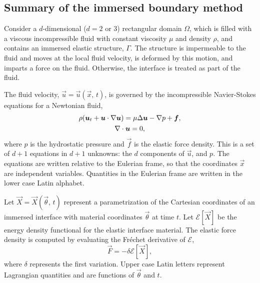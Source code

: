 \subsection{Summary of the immersed boundary method}

Consider a $d$-dimensional ($d=2$ or 3) rectangular domain $\Omega$, which is
filled with a viscous incompressible fluid with constant viscosity $\mu$ and
density $\rho$, and contains an immersed elastic structure, $\Gamma$. The
structure is impermeable to the fluid and moves at the local fluid velocity, is
deformed by this motion, and imparts a force on the fluid. Otherwise, the
interface is treated as part of the fluid. 

The fluid velocity, $\vec{u} = \vec{u}(\vec{x},\,t)$, is governed by the
incompressible Navier-Stokes equations for a Newtonian fluid,
\begin{gather}
    \label{eq:ins-momentum}
    \rho(\boldsymbol{u}_t + \boldsymbol{u}\cdot\nabla\boldsymbol{u}) = \mu\Delta\boldsymbol{u} - \nabla p + \boldsymbol{f}, \\
    \label{eq:ins-incompressibility}
    \nabla\cdot\boldsymbol{u} = 0,
\end{gather}
where $p$ is the hydrostatic pressure and $\vec{f}$ is the elastic force
density. This is a set of $d+1$ equations in $d+1$ unknowns: the $d$ components
of $\vec{u}$, and $p$. The equations are written relative to the Eulerian
frame, so that the coordinates $\vec{x}$ are independent variables. Quantities
in the Eulerian frame are written in the lower case Latin alphabet.

Let $\vec{X}=\vec{X}(\vec{\theta},\,t)$ represent a parametrization of the
Cartesian coordinates of an immersed interface with material coordinates
$\vec{\theta}$ at time $t$. Let $\mathcal{E}[\vec{X}]$ be the energy density
functional for the elastic interface material. The elastic force density is
computed by evaluating the Fréchet derivative of $\mathcal{E}$,
\begin{equation}
    \vec{F} = -\delta \mathcal{E}[\vec{X}],
\end{equation}
where $\delta$ represents the first variation. Upper case Latin letters
represent Lagrangian quantities and are functions of $\vec{\theta}$ and $t$.

